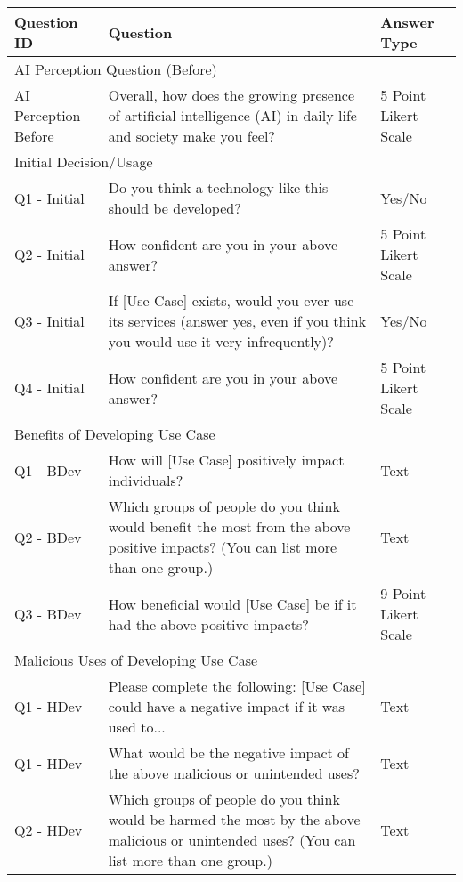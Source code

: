 \begin{table}[!hbpt]
    \footnotesize
    \centering
    \begin{tabularx}{\linewidth}{l|X|l}
    \toprule
         Question ID & Question & Answer Type \\
         \midrule
         \multicolumn{3}{l}{AI Perception Question (Before)}\\
         \midrule
         AI Perception Before & Overall, how does the growing presence of artificial intelligence (AI) in daily life and society make you feel? & 5 Point Likert Scale\\
         \midrule
         \multicolumn{3}{l}{Initial Decision/Usage}\\
         \midrule
         Q1 - Initial & Do you think a technology like this should be developed? & Yes/No\\
         Q2 - Initial & How confident are you in your above answer? & 5 Point Likert Scale \\
         Q3 - Initial & If [Use Case] exists, would you ever use its services (answer yes, even if you think you would use it very infrequently)? & Yes/No \\
         Q4 - Initial & How confident are you in your above answer? & 5 Point Likert Scale \\
         \midrule
         \multicolumn{3}{l}{Benefits of Developing Use Case}\\
         \midrule
         Q1 - BDev & How will [Use Case] positively impact individuals? & Text \\
         Q2 - BDev & Which groups of people do you think would benefit the most from the above positive impacts? (You can list more than one group.) & Text \\
         Q3 - BDev & How beneficial would [Use Case] be if it had the above positive impacts? & 9 Point Likert Scale \\
         \midrule
         \multicolumn{3}{l}{Malicious Uses of Developing Use Case}\\
         \midrule
         Q1 - HDev & Please complete the following: [Use Case] could have a negative impact if it was used to... & Text \\
         Q1 - HDev & What would be the negative impact of the above malicious or unintended uses? & Text \\
         Q2 - HDev & Which groups of people do you think would be harmed the most by the above malicious or unintended uses? (You can list more than one group.) & Text \\

\end{tabularx}
\end{table}
